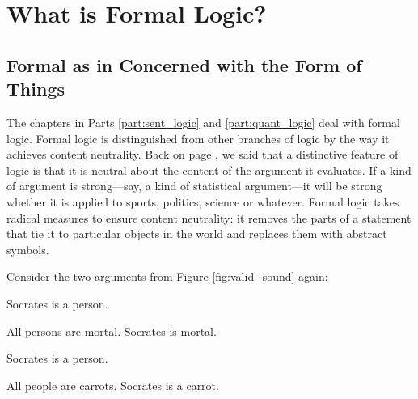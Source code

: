 \chapter{What is Formal Logic?}
\label{chap:whatisformallogic}
\setlength{\parindent}{1em}


\section{Formal as in Concerned with the Form of Things}


The chapters in 
{Parts  %
{\ref{part:sent_logic} and \ref{part:quant_logic}}} %
deal with formal logic. Formal logic is distinguished from other branches of logic by the way it achieves content neutrality. Back on page \pageref{def:content_neutrality}, we said that a distinctive feature of logic is that it is neutral about the content of the argument it evaluates. If a kind of argument is strong---say, a kind of statistical argument---it will be strong whether it is applied to sports, politics, science or whatever. Formal logic takes radical measures to ensure content neutrality: it removes the parts of a statement that tie it to particular objects in the world and replaces them with abstract symbols. 

Consider the two arguments from Figure \ref{fig:valid_sound} again:
\begin{multicols}{2}
\begin{earg*}
\item Socrates is a person.
\item All persons are mortal.
\itemc Socrates is mortal.
\end{earg*}

\begin{earg*}
\item Socrates is a person.
\item All people are carrots.
\itemc Socrates is a carrot.
\end{earg*}

\end{multicols}

